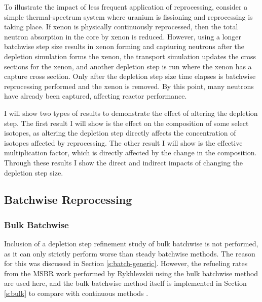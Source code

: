 To illustrate the impact of less frequent application of reprocessing, consider a simple thermal-spectrum system where uranium is fissioning and reprocessing is taking place.
If xenon is physically continuously reprocessed, then the total neutron absorption in the core by xenon is reduced.
However, using a longer batchwise step size results in xenon forming and capturing neutrons after the depletion simulation forms the xenon, the transport simulation updates the cross sections for the xenon, and another depletion step is run where the xenon has a capture cross section.
Only after the depletion step size time elapses is batchwise reprocessing performed and the xenon is removed.
By this point, many neutrons have already been captured, affecting reactor performance.

I will show two types of results to demonstrate the effect of altering the depletion step.
The first result I will show is the effect on the composition of some select isotopes, as altering the depletion step directly affects the concentration of isotopes affected by reprocessing.
The other result I will show is the effective multiplication factor, which is directly affected by the change in the composition.
Through these results I show the direct and indirect impacts of changing the depletion step size.

\subsection{Batchwise Reprocessing}

\subsubsection{Bulk Batchwise}

Inclusion of a depletion step refinement study of bulk batchwise is not performed, as it can only strictly perform worse than steady batchwise methods.
The reason for this was discussed in Section \ref{s:batch-generic}.
However, the refueling rates from the MSBR work performed by Rykhlevskii using the bulk batchwise method are used here, and the bulk batchwise method itself is implemented in Section \ref{s:bulk} to compare with continuous methods \cite{rykhlevskii_advanced_2018}.

